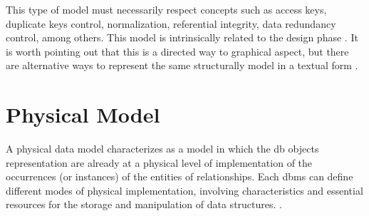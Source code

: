 This type of model must necessarily respect concepts such as access keys, duplicate keys control, normalization, referential integrity, data redundancy control, among others.
This model is intrinsically related to the design phase \cite{Cougo:2013}.
It is worth pointing out that this is a directed way to graphical aspect, but there are alternative ways to represent the same structurally model in a textual form \cite{Martelli:2018}.

\section{Physical Model}
\label{sec_back:physicalModel}

A physical data model characterizes as a model in which the \ac{db} objects representation are already at a physical level of implementation of the occurrences (or instances) of the entities of relationships.
Each \ac{dbms} can define different modes of physical implementation, involving characteristics and essential resources for the storage and manipulation of data structures. \cite{Cougo:2013}.

